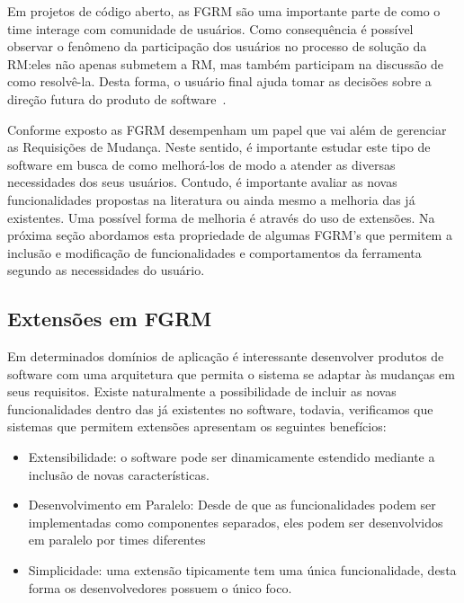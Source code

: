 Em projetos de código aberto, as FGRM são uma importante parte de como o time
interage com comunidade de usuários. Como consequência é possível observar o
fenômeno da participação dos usuários no processo de solução da RM:\@ eles não
apenas submetem a RM, mas também participam na discussão de como resolvê-la.
Desta forma, o usuário final ajuda tomar as decisões sobre a direção futura do
produto de software~\cite{breu2010information}.

Conforme exposto as FGRM desempenham um papel que vai além de gerenciar as
Requisições de Mudança.  Neste sentido, é importante estudar este tipo de
software em busca de como melhorá-los de modo a atender as diversas necessidades
dos seus usuários. Contudo, é importante avaliar as novas funcionalidades
propostas na li\-te\-ra\-tu\-ra ou ainda mesmo a melhoria das já existentes. Uma
possível forma de melhoria é através do uso de extensões. Na próxima seção
abordamos esta propriedade de algumas FGRM's que permitem a inclusão e
modificação de funcionalidades e comportamentos da ferramenta segundo as
necessidades do usuário.

\subsection{Extensões em FGRM}
\label{subsec:extensoes_fgrm}

Em determinados domínios de aplicação é interessante desenvolver produtos de
software com uma arquitetura que permita o sistema se adaptar às mudanças em
seus requisitos. Existe naturalmente a possibilidade de incluir as novas
funcionalidades dentro das já existentes no software, todavia, verificamos que
sistemas que permitem extensões apresentam os seguintes benefícios:

\begin{itemize} \item Extensibilidade: o software pode ser dinamicamente
		estendido mediante a inclusão de novas características.
  	\item Desenvolvimento em Paralelo: Desde de que as funcionalidades podem ser
		implementadas como componentes separados, eles podem ser desenvolvidos
		em paralelo por times diferentes \item Simplicidade: uma  extensão
		tipicamente tem uma única funcionalidade, desta forma os desenvolvedores
		possuem o único foco.  \end{itemize}


